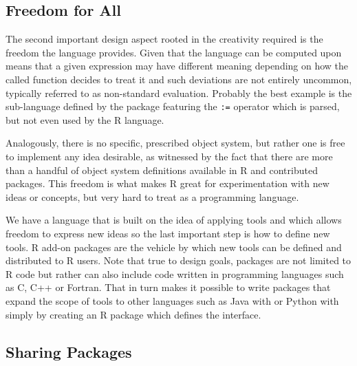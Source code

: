 \hypertarget{freedom-for-all}{%
\subsection{Freedom for All}\label{freedom-for-all}}

The second important design aspect rooted in the creativity required is
the freedom the language provides. Given that the language can be
computed upon means that a given expression may have different meaning
depending on how the called function decides to treat it and such
deviations are not entirely uncommon, typically referred to as
non-standard evaluation. Probably the best example is the sub-language
defined by the  package \citep{DataTable} featuring
the \texttt{:=} operator which is parsed, but not even used by the R
language.

Analogously, there is no specific, prescribed object system, but rather
one is free to implement any idea desirable, as witnessed by the fact
that there are more than a handful of object system definitions
available in R and contributed packages. This freedom is what makes R
great for experimentation with new ideas or concepts, but very hard to
treat as a programming language.

We have a language that is built on the idea of applying tools and which
allows freedom to express new ideas so the last important step is how to
define new tools. R add-on packages \citep{R-ext} are the vehicle by
which new tools can be defined and distributed to R users. Note that
true to design goals, packages are not limited to R code but rather can
also include code written in programming languages such as C, C++ or
Fortran. That in turn makes it possible to write packages that expand
the scope of tools to other languages such as Java with 
\citep{rJava} or Python with  \citep{reticulate}
simply by creating an R package which defines the interface.

\hypertarget{sharing-packages}{%
\subsection{Sharing Packages}\label{sharing-packages}}

